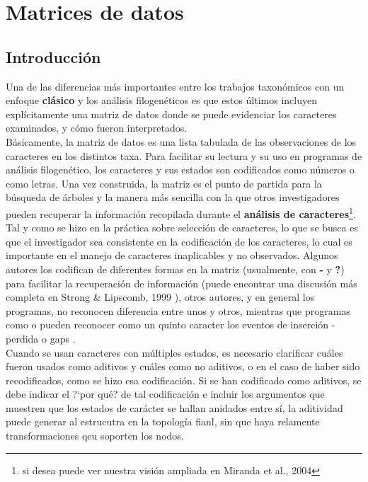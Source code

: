 \chapter{Matrices de datos}

\section*{Introducci\'on} 

Una de las diferencias m\'as importantes entre los trabajos taxon\'omicos con un enfoque \textbf{cl\'asico} y los an\'alisis filogen\'eticos es que estos \'ultimos incluyen expl\'icitamente una matriz de datos donde se puede evidenciar los caracteres examinados, y c\'omo fueron interpretados.\\

B\'asicamente, la matriz de datos es una lista tabulada de las observaciones de los caracteres en los distintos taxa. Para facilitar su lectura y su uso en programas de an\'alisis filogen\'etico, los caracteres y sus estados son codificados como n\'umeros o como letras. Una vez construida, la matriz es el punto de partida para la b\'usqueda de \'arboles y la manera m\'as sencilla con la que otros investigadores pueden recuperar la informaci\'on recopilada durante el \textbf{an\'alisis de caracteres}\footnote{si desea puede ver nuestra visi\'on ampliada en Miranda et al., 2004 }.\\

Tal y como se hizo en la pr\'actica sobre selecci\'on de caracteres, lo que se busca es que el investigador sea consistente en la codificaci\'on de los caracteres, lo cual es importante en el manejo de caracteres inaplicables y no observados. Algunos autores los codifican de diferentes formas en la matriz (usualmente, con \textbf {-} y \textbf {?}) para facilitar la recuperaci\'on de informaci\'on (puede encontrar una discusi\'on m\'as completa en Strong \& Lipscomb, 1999 \cite{Strong1999}),  otros autores, y en general los programas, no reconocen diferencia entre unos y otros, mientras que programas como  o  pueden reconocer como un quinto caracter los eventos de inserci\'on -perdida o gaps \cite{Giribet1999}.\\

Cuando se usan caracteres con m\'ultiples estados, es necesario clarificar cu\'ales fueron usados como aditivos y cu\'ales como no aditivos, o en el caso de haber sido recodificados, como se hizo esa codificaci\'on. Si se han codificado como aditivos, se debe indicar el ?`por qu\'e? de tal codificaci\'on e incluir los argumentos que muestren que los estados de car\'acter se hallan anidados entre s\'i, la aditividad puede generar al estrucutra en la topolog\'ia fianl, sin que haya relamente transformaciones qeu soporten los nodos.\\

